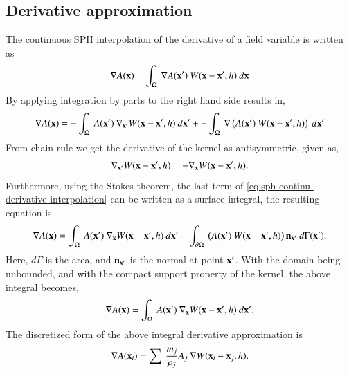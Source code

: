 \subsection{Derivative approximation}
The continuous SPH interpolation of the derivative of a field variable is
written as
\begin{equation}
  \label{intro:eq:sph-continu-derivative-interpolation}
  \nabla A(\mathbf{x}) = \int_{\Omega}\> \nabla A(\mathbf{x}') \> W(\mathbf{x} - \mathbf{x}', h)  \> d\mathbf{x}
\end{equation}
By applying integration by parts to the right hand side results in,
\begin{equation}
  \label{eq:sph-continu-derivative-interpolation}
  \nabla A(\mathbf{x}) = - \int_{\Omega}\> A(\mathbf{x}') \> \nabla_{\mathbf{x}'} W(\mathbf{x} - \mathbf{x}', h)  \> d\mathbf{x}' +
  - \int_{\Omega}\> \nabla \left( A(\mathbf{x}') \> W(\mathbf{x} - \mathbf{x}', h)\right)  \> d\mathbf{x}'
\end{equation}
From chain rule we get the derivative of the kernel as antisymmetric, given as,
\begin{equation}
  \label{intro:eq:sph-kernel-antisymmetric}
  \nabla_{\mathbf{x}'} W(\mathbf{x} - \mathbf{x}', h) = -\nabla_{\mathbf{x}} W(\mathbf{x} - \mathbf{x}', h).
\end{equation}
Furthermore, using the Stokes theorem, the last term of
\cref{eq:sph-continu-derivative-interpolation} can be written as a surface
integral, the resulting equation is
\begin{equation}
  \label{intro:eq:sph-continu-derivative-stokes}
  \nabla A(\mathbf{x}) = \int_{\Omega}\> A(\mathbf{x}') \> \nabla_{\mathbf{x}} W(\mathbf{x} - \mathbf{x}', h)  \> d\mathbf{x}' +
  \int_{\partial \Omega}\> \left( A(\mathbf{x}') \> W(\mathbf{x} - \mathbf{x}', h)\right) \mathbf{n}_{\mathbf{x}'} \> d\Gamma(\mathbf{x}').
\end{equation}
Here, $d\Gamma$ is the area, and $\mathbf{n}_{\mathbf{x}'}$ is the normal at
point $\mathbf{x}'$. With the domain being unbounded, and with the compact support
property of the kernel, the above integral becomes,
\begin{equation}
  \label{intro:eq:sph-continu-derivative-final}
  \nabla A(\mathbf{x}) = \int_{\Omega}\> A(\mathbf{x}') \> \nabla_{\mathbf{x}} W(\mathbf{x} - \mathbf{x}', h)  \> d\mathbf{x}'.
\end{equation}
The discretized form of the above integral derivative approximation is
\begin{equation}
  \label{intro:eq:derivative-discrete_form}
  \nabla A(\mathbf{x}_i) = \sum\> \frac{m_j}{\rho_j} A_j\> \nabla W(\mathbf{x}_i - \mathbf{x}_j, h).
\end{equation}

